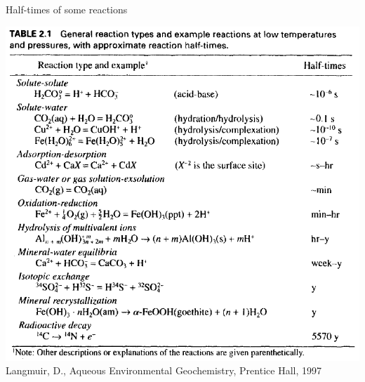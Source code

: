 %
%
\begin{frame}{Half-times of some reactions}
	\begin{center}
		\includegraphics[height=0.85\textheight]{figures/reactive-transport/langmuir-reaction-half-times}{\scriptsize{}}\\
		{\tiny{}Langmuir, D., Aqueous Environmental Geochemistry, Prentice
			Hall, 1997}{\tiny\par}
		\par\end{center}
	
\end{frame}
%

